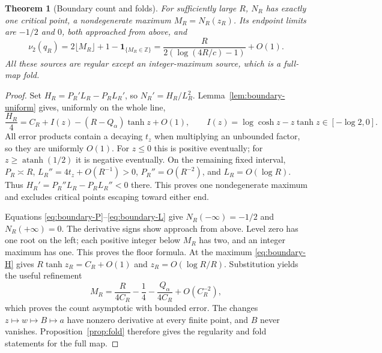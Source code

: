 \documentclass[11pt,a4paper]{article}
\newtheorem{theorem}{Theorem}[section]
\theoremstyle{remark}\newtheorem{remark}[theorem]{Remark}
\newcommand{\atanh}{\operatorname{atanh}}
\newcommand{\ind}{\mathbf{1}}
\begin{document}
\begin{theorem}[Boundary count and folds]\label{thm:boundary-count}
For sufficiently large $R$, $N_R$ has exactly one critical point,
a nondegenerate maximum $M_R=N_R(z_R)$. Its endpoint limits are
$-1/2$ and $0$, both approached from above, and
\begin{equation}\label{eq:boundary-count}
 \nu_2(q_R)=2\lfloor M_R\rfloor+1-\ind_{\{M_R\in\mathbb Z\}}
 =\frac{R}{2(\log(4R/c)-1)}+O(1).
\end{equation}
All these sources are regular except an integer-maximum source,
which is a full-map fold.
\end{theorem}
\begin{proof}
Set $H_R=P_R'L_R-P_RL_R'$, so $N_R'=H_R/L_R^2$.
Lemma~\ref{lem:boundary-uniform} gives, uniformly on the whole line,
\begin{equation}\label{eq:boundary-H}
 \frac{H_R}4=C_R+I(z)-(R-Q_\alpha)\tanh z+O(1),\qquad
 I(z)=\log\cosh z-z\tanh z\in[-\log2,0].
\end{equation}
All error products contain a decaying $t_z$ when multiplying an
unbounded factor, so they are uniformly $O(1)$.
For $z\le0$ this is positive eventually; for
$z\ge\atanh(1/2)$ it is negative eventually.
On the remaining fixed interval,
$P_R\asymp R$, $L_R''=4t_z+O(R^{-1})>0$,
$P_R''=O(R^{-2})$, and $L_R=O(\log R)$. Thus
$H_R'=P_R''L_R-P_RL_R''<0$ there.
This proves one nondegenerate maximum and excludes critical points
escaping toward either end.

Equations \eqref{eq:boundary-P}--\eqref{eq:boundary-L} give
$N_R(-\infty)=-1/2$ and $N_R(+\infty)=0$.
The derivative signs show approach from above.
Level zero has one root on the left; each positive integer below
$M_R$ has two, and an integer maximum has one. This proves the
floor formula.
At the maximum \eqref{eq:boundary-H} gives
$R\tanh z_R=C_R+O(1)$ and $z_R=O(\log R/R)$.
Substitution yields the useful refinement
\[
 M_R=\frac R{4C_R}-\frac14-\frac{Q_\alpha}{4C_R}
                  +O(C_R^{-2}),
\]
which proves the count asymptotic with bounded error.
The changes $z\mapsto w\mapsto B\mapsto a$ have nonzero
derivative at every finite point, and $B$ never vanishes.
Proposition~\ref{prop:fold} therefore gives the regularity and fold
statements for the full map.
\end{proof}
\end{document}
